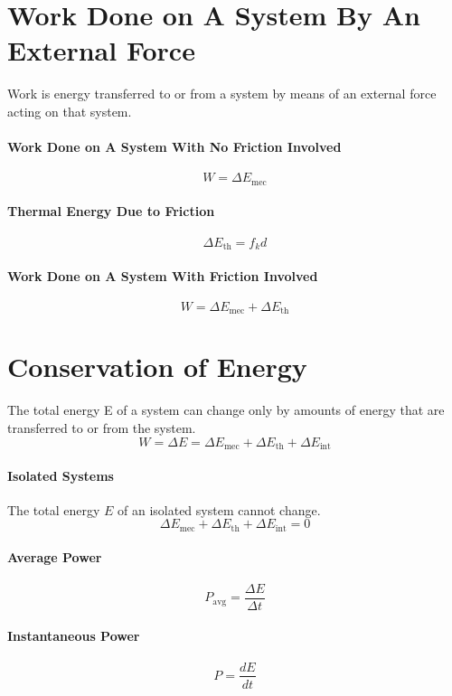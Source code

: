 \documentclass{article}
\begin{document}
    \section{Work Done on A System By An External Force}

        Work is energy transferred to or from a system by means of an external force acting on that system.

        \paragraph{Work Done on A System With No Friction Involved}
        \begin{equation}
            W = \Delta E_\text{mec}
        \end{equation}

        \paragraph{Thermal Energy Due to Friction}
        \begin{equation}
            \Delta E_\text{th} = f_k d
        \end{equation}

        \paragraph{Work Done on A System With Friction Involved}
        \begin{equation}
            W = \Delta E_\text{mec} + \Delta E_\text{th}
        \end{equation}

    \section{Conservation of Energy}

        The total energy E of a system can change only by amounts of energy that are transferred to or from the system.
        \begin{equation}
            W = \Delta E = \Delta E_\text{mec} + \Delta E_\text{th} + \Delta E_\text{int}
        \end{equation}

        \paragraph{Isolated Systems}
        The total energy $E$ of an isolated system cannot change.
        \begin{equation}
            \Delta E_\text{mec} + \Delta E_\text{th} + \Delta E_\text{int} = 0
        \end{equation}

        \paragraph{Average Power}
        \begin{equation}
            P_\text{avg} = \frac{\Delta E}{\Delta t}
        \end{equation}

        \paragraph{Instantaneous Power}
        \begin{equation}
            P = \frac{dE}{dt}
        \end{equation}
\end{document}
